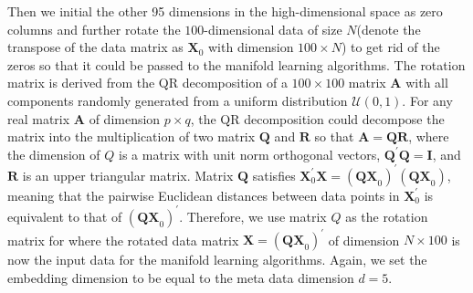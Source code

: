 \documentclass[11pt,a4paper,]{article}
\begin{document}
Then we initial the other 95 dimensions in the high-dimensional space as zero columns and further rotate the \(100\)-dimensional data of size \(N\)(denote the transpose of the data matrix as \(\pmb{X}_0\) with dimension \(100 \times N\)) to get rid of the zeros so that it could be passed to the manifold learning algorithms. The rotation matrix is derived from the QR decomposition of a \(100\times 100\) matrix \(\pmb{A}\) with all components randomly generated from a uniform distribution \(\mathcal{U}(0,1)\). For any real matrix \(\pmb{A}\) of dimension \(p\times q\), the QR decomposition could decompose the matrix into the multiplication of two matrix \(\pmb{Q}\) and \(\pmb{R}\) so that \(\pmb{A} = \pmb{QR}\), where the dimension of \(Q\) is a matrix with unit norm orthogonal vectors, \(\pmb{Q}^\prime \pmb{Q} = \pmb{I}\), and \(\pmb{R}\) is an upper triangular matrix. Matrix \(\pmb{Q}\) satisfies
\(\pmb{X}_0^\prime \pmb{X}=(\pmb{QX}_0)^\prime(\pmb{QX}_0)\), meaning that the pairwise Euclidean distances between data points in
\(\pmb{X}_0^\prime\) is equivalent to that of \((\pmb{QX}_0)^\prime\).
Therefore, we use matrix \(Q\) as the rotation matrix for where the rotated data matrix \(\pmb{X} = (\pmb{QX}_0)^\prime\) of dimension \(N \times 100\) is now the input data for the manifold learning algorithms. Again, we set the embedding dimension to be equal to the meta data dimension \(d=5\).
\end{document}
